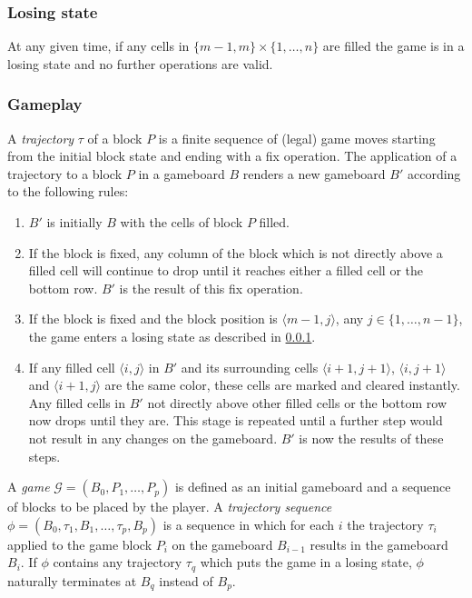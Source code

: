 \subsubsection{Losing state}
\label{subsub:losing}
At any given time, if any cells in $\{m-1, m\} \times \{1, \ldots, n\}$ are filled the game is in a losing state and no further operations are valid.

\subsubsection{Gameplay}
\label{subsub:gameplay}

A \textit{trajectory} $\tau$ of a block $P$ is a finite sequence of (legal) game moves starting from the initial block state and ending with a fix operation. The application of a trajectory to a block $P$ in a gameboard $B$ renders a new gameboard $B'$ according to the following rules:

    \begin{enumerate}
            \item $B'$ is initially $B$ with the cells of block $P$ filled.
            \item If the block is fixed, any column of the block which is not directly above a filled cell will continue to drop until it reaches either a filled cell or the bottom row. $B'$ is the result of this fix operation.
            \item If the block is fixed and the block position is $\langle m-1, j\rangle$, any $j \in \{1, \ldots, n-1\}$, the game enters a losing state as described in \ref{subsub:losing}.
            \item If any filled cell $\langle i,j \rangle$ in $B'$ and its surrounding cells $\langle i+1,j+1 \rangle$, $\langle i, j+1 \rangle$ and $\langle i+1, j \rangle$ are the same color, these cells are marked and cleared instantly. Any filled cells in $B'$ not directly above other filled cells or the bottom row now drops until they are. This stage is repeated until a further step would not result in any changes on the gameboard. $B'$ is now the results of these steps.
    \end{enumerate}

A \textit{game} $\mathcal{G} = (B_0, P_1, \ldots, P_p)$ is defined as an initial gameboard and a sequence of blocks to be placed by the player. A \textit{trajectory sequence} $\phi = (B_0, \tau_1, B_1, \ldots ,\tau_p, B_p)$ is a sequence in which for each $i$ the trajectory $\tau_i$ applied to the game block $P_i$ on the gameboard $B_{i-1}$ results in the gameboard $B_i$. If $\phi$ contains any trajectory $\tau_q$ which puts the game in a losing state, $\phi$ naturally terminates at $B_q$ instead of $B_p$.

